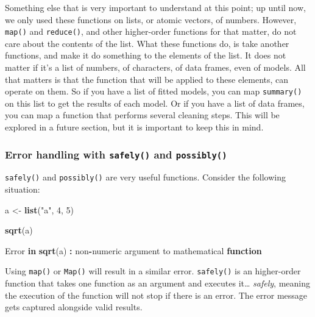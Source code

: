 \documentclass[
]{article}
\newenvironment{Shaded}{\begin{snugshade}}{\end{snugshade}}
\newcommand{\ControlFlowTok}[1]{\textcolor[rgb]{0.13,0.29,0.53}{\textbf{#1}}}
\newcommand{\DecValTok}[1]{\textcolor[rgb]{0.00,0.00,0.81}{#1}}
\newcommand{\KeywordTok}[1]{\textcolor[rgb]{0.13,0.29,0.53}{\textbf{#1}}}
\newcommand{\NormalTok}[1]{#1}
\newcommand{\OperatorTok}[1]{\textcolor[rgb]{0.81,0.36,0.00}{\textbf{#1}}}
\newcommand{\StringTok}[1]{\textcolor[rgb]{0.31,0.60,0.02}{#1}}
\begin{document}
Something else that is very important to understand at this point; up until now, we only used these
functions on lists, or atomic vectors, of numbers. However, \texttt{map()} and \texttt{reduce()}, and other
higher-order functions for that matter, do not care about the contents of the list. What these
functions do, is take another functions, and make it do something to the elements of the list.
It does not matter if it's a list of numbers, of characters, of data frames, even of models. All that
matters is that the function that will be applied to these elements, can operate on them.
So if you have a list of fitted models, you can map \texttt{summary()} on this list to get the results of
each model. Or if you have a list of data frames, you can map a function that performs several
cleaning steps. This will be explored in a future section, but it is important to keep this in mind.

\hypertarget{error-handling-with-safely-and-possibly}{%
\subsubsection{\texorpdfstring{Error handling with \texttt{safely()} and \texttt{possibly()}}{Error handling with safely() and possibly()}}\label{error-handling-with-safely-and-possibly}}

\texttt{safely()} and \texttt{possibly()} are very useful functions. Consider the following situation:

\begin{Shaded}
\begin{Highlighting}[]
\NormalTok{a \textless{}{-}}\StringTok{ }\KeywordTok{list}\NormalTok{(}\StringTok{"a"}\NormalTok{, }\DecValTok{4}\NormalTok{, }\DecValTok{5}\NormalTok{)}

\KeywordTok{sqrt}\NormalTok{(a)}
\end{Highlighting}
\end{Shaded}

\begin{Shaded}
\begin{Highlighting}[]
\NormalTok{Error }\ControlFlowTok{in} \KeywordTok{sqrt}\NormalTok{(a) }\OperatorTok{:}\StringTok{ }\NormalTok{non}\OperatorTok{{-}}\NormalTok{numeric argument to mathematical }\ControlFlowTok{function}
\end{Highlighting}
\end{Shaded}

Using \texttt{map()} or \texttt{Map()} will result in a similar error. \texttt{safely()} is an higher-order function that
takes one function as an argument and executes it\ldots{} \emph{safely}, meaning the execution of the function
will not stop if there is an error. The error message gets captured alongside valid results.
\end{document}
